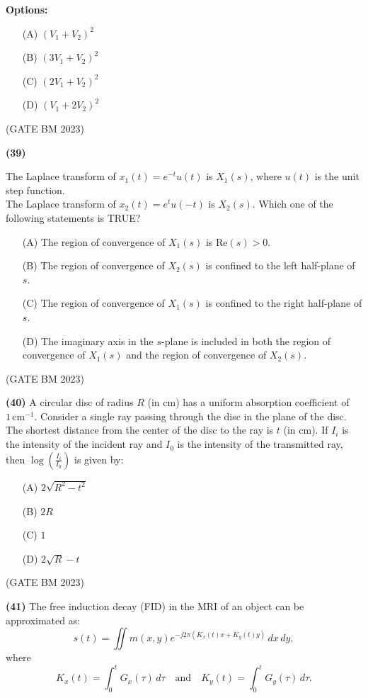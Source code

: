 \documentclass[journal]{IEEEtran}
\numberwithin{equation}{enumi}
\numberwithin{figure}{enumi}
\begin{document}
\textbf{Options:}
\begin{itemize}
    \item[(A)] \( (V_1 + V_2)^2 \)
    \item[(B)] \( (3V_1 + V_2)^2 \)
    \item[(C)] \( (2V_1 + V_2)^2 \)
    \item[(D)] \( (V_1 + 2V_2)^2 \)
\end{itemize}
\hfill (GATE BM 2023)

\textbf{(39)}

The Laplace transform of \( x_1(t) = e^{-t} u(t) \) is \( X_1(s) \), where \( u(t) \) is the unit step function. \\
The Laplace transform of \( x_2(t) = e^{t} u(-t) \) is \( X_2(s) \). Which one of the following statements is TRUE?

\begin{itemize}
    \item[(A)] The region of convergence of \( X_1(s) \) is \( \mathrm{Re}(s) > 0 \).
    \item[(B)] The region of convergence of \( X_2(s) \) is confined to the left half-plane of \( s \).
    \item[(C)] The region of convergence of \( X_1(s) \) is confined to the right half-plane of \( s \).
    \item[(D)] The imaginary axis in the \( s \)-plane is included in both the region of convergence of \( X_1(s) \) and the region of convergence of \( X_2(s) \).
\end{itemize}
\hfill (GATE BM 2023)

\textbf{(40)} 
A circular disc of radius \( R \) (in cm) has a uniform absorption coefficient of \( 1 \, \text{cm}^{-1} \). 
Consider a single ray passing through the disc in the plane of the disc. The shortest distance from the center of the disc to the ray is \( t \) (in cm). 
If \( I_i \) is the intensity of the incident ray and \( I_0 \) is the intensity of the transmitted ray, then \( \log\left(\frac{I_i}{I_0}\right) \) is given by:

\begin{itemize}
    \item[(A)] \( 2\sqrt{R^2 - t^2} \)
    \item[(B)] \( 2R \)
    \item[(C)] \( 1 \)
    \item[(D)] \( 2\sqrt{R} - t \)
\end{itemize}
\hfill (GATE BM 2023)

\textbf{(41)} 
The free induction decay (FID) in the MRI of an object can be approximated as:
\[
s(t) = \iint m(x,y) e^{-j 2\pi \left(K_x(t)x + K_y(t)y\right)} \, dx \, dy,
\]
where
\[
K_x(t) = \int_0^t G_x(\tau)\, d\tau \quad \text{and} \quad K_y(t) = \int_0^t G_y(\tau)\, d\tau.
\]
\end{document}
